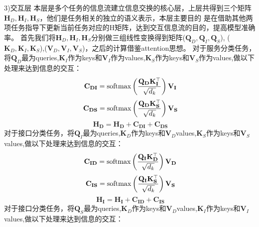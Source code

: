 3)交互层
本层是多个任务的信息流建立信息交换的核心层，上层共得到三个矩阵$\mathbf{H}_{D},\mathbf{H}_{I},\mathbf{H}_{S}$，他们是任务相关的独立的语义表示，本层主要目的
是在借助其他两项任务指导下更新当前任务对应的H矩阵，达到交互信息流的目的，提高模型准确率。
首先我们将$\mathbf{H}_{D},\mathbf{H}_{I},\mathbf{H}_{S}$分别做三组线性变换得到矩阵($\mathbf{Q}_{D},\mathbf{Q}_{I},\mathbf{Q}_{S}$),
($\mathbf{K}_{D},\mathbf{K}_{I},\mathbf{K}_{S}$),($\mathbf{V}_{D},\mathbf{V}_{I},\mathbf{V}_{S}$)，之后的计算借鉴attention思想。
对于服务分类任务，将$\mathbf{Q}_{D}$最为queries,$\mathbf{K}_{I}$作为keys和$\mathbf{V}_{I}$作为values,$\mathbf{K}_{S}$作为keys和$\mathbf{V}_{S}$作为values,做以下处理来达到信息的交互：
\begin{equation}
  \mathbf{C}_{\mathbf{DI}}=\operatorname{softmax}\left(\frac{\mathbf{Q}_{\mathbf{D}} \mathbf{K}_{\mathbf{I}}^{\top}}{\sqrt{d_{k}}}\right) \mathbf{V}_{\mathbf{I}}\\
\end{equation}
\begin{equation}  
\mathbf{C}_{\mathbf{DS}}=\operatorname{softmax}\left(\frac{\mathbf{Q}_{\mathbf{D}} \mathbf{K}_{\mathbf{S}}^{\top}}{\sqrt{d_{k}}}\right) \mathbf{V}_{\mathbf{S}}\\
\end{equation}
\begin{equation}  
\mathbf{H}_\mathbf{D}=\mathbf{H}_\mathbf{D}+\mathbf{C}_{\mathbf{DI}}+\mathbf{C}_{\mathbf{DS}}
\end{equation}
对于接口分类任务，将$\mathbf{Q}_{I}$最为queries,$\mathbf{K}_{D}$作为keys和$\mathbf{V}_{D}$values,$\mathbf{K}_{S}$作为keys和$\mathbf{V}_{S}$values,做以下处理来达到信息的交互：
\begin{equation}
  \mathbf{C}_{\mathbf{ID}}=\operatorname{softmax}\left(\frac{\mathbf{Q}_{\mathbf{I}} \mathbf{K}_{\mathbf{D}}^{\top}}{\sqrt{d_{k}}}\right) \mathbf{V}_{\mathbf{D}}\\
\end{equation}
\begin{equation}
  \mathbf{C}_{\mathbf{IS}}=\operatorname{softmax}\left(\frac{\mathbf{Q}_{\mathbf{I}} \mathbf{K}_{\mathbf{S}}^{\top}}{\sqrt{d_{k}}}\right) \mathbf{V}_{\mathbf{S}}\\
\end{equation}
\begin{equation}
  \mathbf{H}_\mathbf{I}=\mathbf{H}_\mathbf{I}+\mathbf{C}_{\mathbf{ID}}+\mathbf{C}_{\mathbf{IS}}
\end{equation}
对于接口分类任务，将$\mathbf{Q}_{S}$最为queries,$\mathbf{K}_{D}$作为keys和$\mathbf{V}_{D}$values,$\mathbf{K}_{I}$作为keys和$\mathbf{V}_{I}$values,做以下处理来达到信息的交互：
